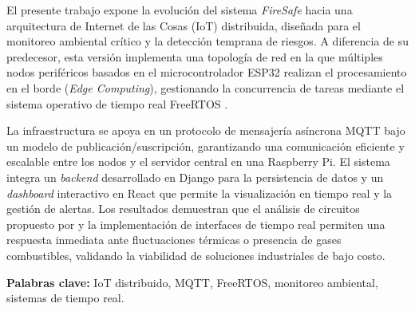 El presente trabajo expone la evolución del sistema \textit{FireSafe} hacia una arquitectura de Internet de las Cosas (IoT) distribuida, diseñada para el monitoreo ambiental crítico y la detección temprana de riesgos. A diferencia de su predecesor, esta versión implementa una topología de red en la que múltiples nodos periféricos basados en el microcontrolador ESP32 realizan el procesamiento en el borde (\textit{Edge Computing}), gestionando la concurrencia de tareas mediante el sistema operativo de tiempo real FreeRTOS \citep{valvano2014volume1}. 

La infraestructura se apoya en un protocolo de mensajería asíncrona MQTT bajo un modelo de publicación/suscripción, garantizando una comunicación eficiente y escalable entre los nodos y el servidor central en una Raspberry Pi. El sistema integra un \textit{backend} desarrollado en Django para la persistencia de datos y un \textit{dashboard} interactivo en React que permite la visualización en tiempo real y la gestión de alertas. Los resultados demuestran que el análisis de circuitos propuesto por \citet{boylestad2009} y la implementación de interfaces de tiempo real \citep{valvano2014volume2} permiten una respuesta inmediata ante fluctuaciones térmicas o presencia de gases combustibles, validando la viabilidad de soluciones industriales de bajo costo.

\textbf{Palabras clave:} IoT distribuido, MQTT, FreeRTOS, monitoreo ambiental, sistemas de tiempo real.